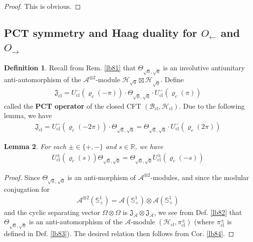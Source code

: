\documentclass[11pt,b5paper,notitlepage]{article}
\theoremstyle{definition}
\newtheorem{df}{Definition}[section]
\theoremstyle{plain}
\newtheorem{lm}[df]{Lemma}
\newcommand{\fk}{\mathfrak}
\newcommand{\ovl}{\overline}
\newcommand{\Rbb}{\mathbb R}
\newcommand{\Sbb}{{\mathbb S}}
\newcommand{\cl}{\mathrm{cl}}
\newcommand{\MA}{\mathcal A}
\newcommand{\MH}{\mathcal H}
\newcommand{\Maa}{{\mathcal A^{\otimes 2}}}
\newcommand{\sqz}{{\sqrt 0}}
\newcommand{\MHcl}{\mathcal H_{\mathrm{cl}}}
\newcommand{\Bcl}{\mathcal B_{\mathrm{cl}}}
\newcommand{\Ucl}{U_{\mathrm{cl}}}
\newcommand{\Jcl}{\mathfrak J_{\mathrm{cl}}}
\numberwithin{equation}{section}
\begin{document}
\begin{proof}
This is obvious.
\end{proof}





\subsection{PCT symmetry and Haag duality for $O_\leftarrow$ and $O_\rightarrow$}\label{lb161}








\begin{df}\label{lb101}
Recall from Rem. \ref{lb81} that $\Theta_{\sqz,\ovl\sqz}$ is an involutive antiunitary anti-automorphism of the $\Maa$-module $\MH_\sqz\boxtimes\MH_{\ovl\sqz}$. Define
\begin{align*}
\pmb{\Jcl}=\Ucl^-(\varrho_c(-\pi))\cdot\Theta_{\sqz,\ovl\sqz}\cdot \Ucl^-(\varrho_c(\pi))
\end{align*}
called the \textbf{PCT operator} of the closed CFT $(\Bcl,\MHcl)$. Due to the following lemma, we have
\begin{align*}
\Jcl=\Ucl^-(\varrho_c(-2\pi))\cdot\Theta_{\sqz,\ovl\sqz}=\Theta_{\sqz,\ovl\sqz}\cdot \Ucl^-(\varrho_c(2\pi))
\end{align*}
\end{df}


\begin{lm}\label{lb88}
For each $\pm\in\{+,-\}$ and $s\in\Rbb$, we have
\begin{align*}
\Ucl^\pm(\varrho_c(s))\Theta_{\sqz,\ovl\sqz}=\Theta_{\sqz,\ovl\sqz}\Ucl^\pm(\varrho_c(-s))
\end{align*}
\end{lm}

\begin{proof}
Since $\Theta_{\sqz,\ovl\sqz}$ is an anti-morphism of $\Maa$-modules, and since the modular conjugation for
\begin{align*}
\Maa(\Sbb^1_+)=\MA(\Sbb^1_+)\otimes\MA(\Sbb^1_+)
\end{align*}
and the cyclic separating vector $\Omega\otimes\Omega$ is $\fk J_\MA\otimes\fk J_\MA$, we see from Def. \ref{lb82} that $\Theta_{\sqz,\ovl\sqz}$ is an anti-automorphism of the $\MA$-module $(\MHcl,\pi_\cl^\pm)$ (where $\pi_\cl^\pm$ is defined in Def. \ref{lb83}). The desired relation then follows from Cor. \ref{lb84}.
\end{proof}
\end{document}
